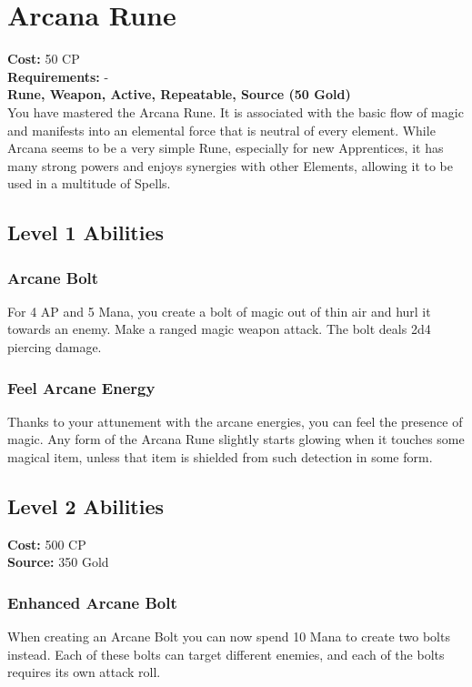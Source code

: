 \twocolumn
\section{Arcana Rune}\label{rune:arcana}
\textbf{Cost:} 50 CP\\
\textbf{Requirements:} -\\
\textbf{Rune, Weapon, Active, Repeatable, Source (50 Gold)}\\
You have mastered the Arcana Rune. It is associated with the basic flow of magic and manifests into an elemental force that is neutral of every element. While Arcana seems to be a very simple Rune, especially for new Apprentices, it has many strong powers and enjoys synergies with other Elements, allowing it to be used in a multitude of Spells.\\
\subsection{Level 1 Abilities}

\subsubsection{Arcane Bolt}
For 4 AP and 5 Mana, you create a bolt of magic out of thin air and hurl it towards an enemy.
Make a ranged magic weapon attack.
The bolt deals 2d4 piercing damage.

\subsubsection{Feel Arcane Energy}
Thanks to your attunement with the arcane energies, you can feel the presence of magic.
Any form of the Arcana Rune slightly starts glowing when it touches some magical item, unless that item is shielded from such detection in some form.

\subsection{Level 2 Abilities}
\textbf{Cost:} 500 CP\\
\textbf{Source:} 350 Gold
\subsubsection{Enhanced Arcane Bolt}
When creating an Arcane Bolt you can now spend 10 Mana to create two bolts instead.
Each of these bolts can target different enemies, and each of the bolts requires its own attack roll.

